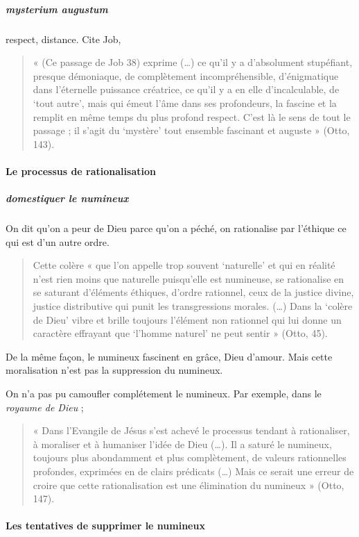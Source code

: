 \subparagraph{mysterium augustum} respect, distance. Cite Job, 

\begin{quote}
    « (Ce passage de Job  38) exprime (…) ce qu’il y a d’absolument stupéfiant, presque démoniaque, de complètement incompréhensible, d’énigmatique dans l’éternelle puissance créatrice, ce qu’il y a en elle d’incalculable, de ‘tout autre’, mais qui émeut l’âme dans ses profondeurs, la fascine et la remplit en même temps du plus profond respect. C’est là le sens de tout le passage ; il s’agit du ‘mystère’ tout ensemble fascinant et auguste » (Otto, 143). 
\end{quote}



\paragraph{Le processus de rationalisation}

\subparagraph{domestiquer le numineux} On dit qu'on a peur de Dieu parce qu'on a péché, on rationalise par l'éthique ce qui est d'un autre ordre. 
\begin{quote}
    Cette colère « que l’on appelle trop souvent ‘naturelle’ et qui en réalité n’est rien moins que naturelle puisqu’elle est numineuse, se rationalise en se saturant d’éléments éthiques, d’ordre rationnel, ceux de la justice divine, justice distributive qui punit les transgressions morales. (…) Dans la ‘colère de Dieu’ vibre et brille toujours l’élément non rationnel qui lui donne un caractère effrayant que ‘l’homme naturel’ ne peut sentir » (Otto, 45).  
\end{quote}

De la même façon, le numineux fascinent en grâce, Dieu d'amour. Mais cette moralisation n'est pas la suppression du numineux.

On n'a pas pu camoufler complétement le numineux. Par exemple, dans le \textit{royaume de Dieu} ; 
\begin{quote}
    « Dans l’Evangile de Jésus s’est achevé le processus tendant à rationaliser, à moraliser et à humaniser l’idée de Dieu (…). Il a saturé le numineux, toujours plus abondamment et plus complètement, de valeurs rationnelles profondes, exprimées en de clairs prédicats (…) Mais ce serait une erreur de croire que cette rationalisation est une élimination du numineux » (Otto, 147). 
\end{quote}

\paragraph{Les tentatives de supprimer le numineux}

